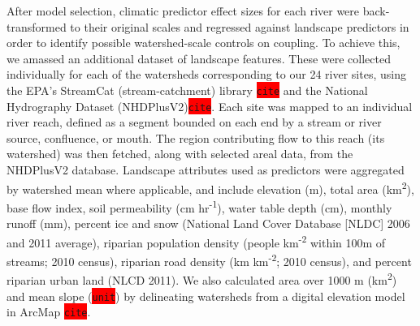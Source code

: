 \documentclass{article}
\begin{document}
After model selection, climatic predictor effect sizes for each river were back-transformed to their original scales and regressed against landscape predictors in order to identify possible watershed-scale controls on coupling. To achieve this, we amassed an additional dataset of landscape features. These were collected individually for each of the watersheds corresponding to our 24 river sites, using the EPA's StreamCat (stream-catchment) library \colorbox{red}{\lstinline{cite}} and the National Hydrography Dataset (NHDPlusV2)\colorbox{red}{\lstinline{cite}}. Each site was mapped to an individual river reach, defined as a segment bounded on each end by a stream or river source, confluence, or mouth. The region contributing flow to this reach (its watershed) was then fetched, along with selected areal data, from the NHDPlusV2 database. Landscape attributes used as predictors were aggregated by watershed mean where applicable, and include elevation (m), total area (km\textsuperscript{2}), base flow index, soil permeability (cm hr\textsuperscript{-1}), water table depth (cm), monthly runoff (mm), percent ice and snow (National Land Cover Database [NLDC] 2006 and 2011 average), riparian population density (people km\textsuperscript{-2} within 100m of streams; 2010 census), riparian road density (km km\textsuperscript{-2}; 2010 census), and percent riparian urban land (NLCD 2011). We also calculated area over 1000 m (km\textsuperscript{2}) and mean slope (\colorbox{red}{\lstinline{unit}}) by delineating watersheds from a digital elevation model in ArcMap \colorbox{red}{\lstinline{cite}}.
\end{document}
